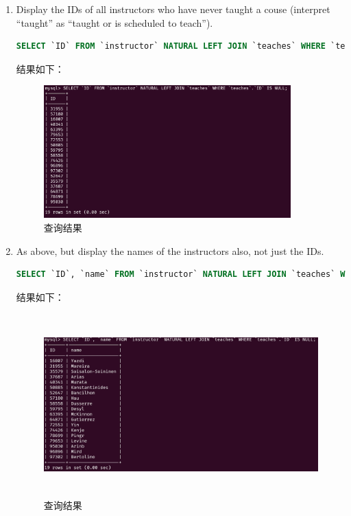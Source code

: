 \documentclass{article}
\begin{document}
\begin{enumerate}
\item Display the IDs of all instructors who have never taught a couse (interpret “taught” as “taught or is scheduled to teach”).

\begin{lstlisting}[language=sql]
SELECT `ID` FROM `instructor` NATURAL LEFT JOIN `teaches` WHERE `teaches`.`ID` IS NULL; 
\end{lstlisting}

结果如下：

\begin{figure}[H]
\centering
\includegraphics[width=0.9\textwidth]{img/13.png}
\caption{查询结果}
\end{figure}

\item As above, but display the names of the instructors also, not just the IDs.

\begin{lstlisting}[language=sql]
SELECT `ID`, `name` FROM `instructor` NATURAL LEFT JOIN `teaches` WHERE `teaches`.`ID` IS NULL;
\end{lstlisting}

结果如下：

\begin{figure}[H]
\centering
\includegraphics[height=7cm]{img/14.png} 
\caption{查询结果}
\end{figure}


\end{enumerate}
\end{document}
